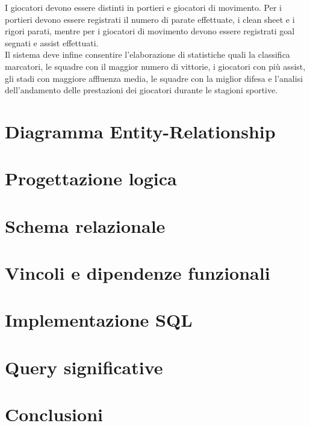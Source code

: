 \documentclass[12pt,a4paper]{report}
\begin{document}
I giocatori devono essere distinti in portieri e giocatori di movimento. Per i portieri devono essere registrati il numero di parate effettuate, i clean sheet e i rigori parati, mentre per i giocatori di movimento devono essere registrati goal segnati e assist effettuati.\\
Il sistema deve infine consentire l’elaborazione di statistiche quali la classifica marcatori, le squadre con il maggior numero di vittorie, i giocatori con più assist, gli stadi con maggiore affluenza media, le squadre con la miglior difesa e l’analisi dell’andamento delle prestazioni dei giocatori durante le stagioni sportive.
	
	\chapter{Diagramma Entity-Relationship}
	
	\chapter{Progettazione logica}
	
	\chapter{Schema relazionale}
	
	\chapter{Vincoli e dipendenze funzionali}
	
	\chapter{Implementazione SQL}
	
	\chapter{Query significative}
	
	\chapter{Conclusioni}
	
\end{document}
